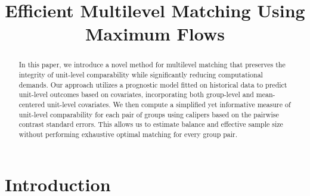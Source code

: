\documentclass[aoas]{imsart}
\theoremstyle{plain}
\theoremstyle{definition}
\begin{document}
\begin{frontmatter}
\title{Efficient Multilevel Matching Using Maximum Flows}


\begin{abstract}
In this paper, we introduce a novel method for multilevel matching that preserves the integrity of unit-level
comparability while significantly reducing computational demands. Our approach utilizes a prognostic model
fitted on historical data to predict unit-level outcomes based on covariates, incorporating both group-level
and mean-centered unit-level covariates. We then compute a simplified yet informative measure of unit-level
comparability for each pair of groups using calipers based on the pairwise contrast standard errors. This
allows us to estimate balance and effective sample size without performing exhaustive optimal matching for
every group pair.
\end{abstract}

\begin{keyword}
\end{keyword}

\end{frontmatter}

\section{Introduction}
\end{document}

